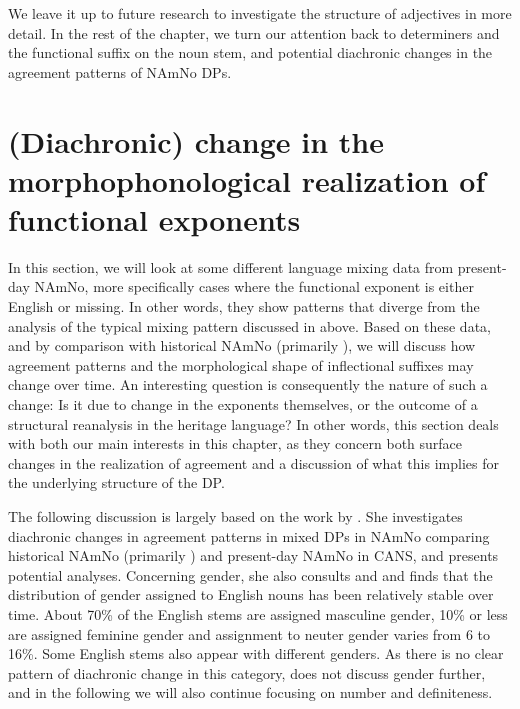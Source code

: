 \documentclass[output=paper]{langscibook}
\begin{document}
We leave it up to future research to investigate the structure of adjectives in more detail. In the rest of the chapter, we turn our attention back to determiners and the functional suffix on the noun stem, and potential diachronic changes in the agreement patterns of NAmNo DPs.


\section{(Diachronic) change in the morphophonological realization of functional exponents}\label{sec:riksem:5}

In this section, we will look at some different language mixing data from present-day NAmNo, more specifically cases where the functional exponent is either English or missing. In other words, they show patterns that diverge from the analysis of the typical mixing pattern discussed in  above. Based on these data, and by comparison with historical NAmNo (primarily \citealt{Haugen1953}), we will discuss how agreement patterns and the morphological shape of inflectional suffixes may change over time. An interesting question is consequently the nature of such a change: Is it due to change in the exponents themselves, or the outcome of a structural reanalysis in the heritage language? In other words, this section deals with both our main interests in this chapter, as they concern both surface changes in the realization of agreement and a discussion of what this implies for the underlying structure of the DP. 



The following discussion is largely based on the work by \citet{Riksem2017}. She investigates diachronic changes in agreement patterns in mixed DPs in NAmNo comparing historical NAmNo (primarily \citealt{Haugen1953}) and present-day NAmNo in CANS, and presents potential analyses. Concerning gender, she also consults \citet{Flom1900, Flom1903} and \citet{Hjelde1992} and finds that the distribution of gender assigned to English nouns has been relatively stable over time. About 70\% of the English stems are assigned masculine gender, 10\% or less are assigned feminine gender and assignment to neuter gender varies from 6 to 16\%. Some English stems also appear with different genders. As there is no clear pattern of diachronic change in this category, \citet{Riksem2017} does not discuss gender further, and in the following we will also continue focusing on number and definiteness.
\end{document}
